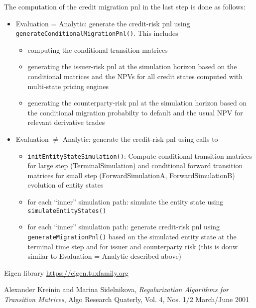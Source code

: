 \documentclass[12pt, a4paper]{article}
\begin{document}
The computation of the credit migration pnl in the last step is done as follows:

\begin{itemize}
\item Evaluation = Analytic: generate the credit-risk pnl using \verb+generateConditionalMigrationPnl()+. This includes
  \begin{itemize}
  \item computing the conditional transition matrices
  \item generating the issuer-risk pnl at the simulation horizon based on the conditional matrices and the NPVs for all
    credit states computed with multi-state pricing engines
  \item generating the counterparty-risk pnl at the simulation horizon based on the conditional migration probabilty to
    default and the usual NPV for relevant derivative trades
  \end{itemize}
\item Evaluation $\neq$ Analytic: generate the credit-risk pnl using calls to
  \begin{itemize}
  \item \verb+initEntityStateSimulation()+: Compute conditional transition matrices for large step (TerminalSimulation) and
    conditional forward transition matrices for small step (ForwardSimulationA, ForwardSimulationB) evolution of entity states
  \item for each ``inner'' simulation path: simulate the entity state using \verb+simulateEntityStates()+
  \item for each ``inner'' simulation path: generate credit-risk pnl using \verb+generateMigrationPnl()+ based on the
    simulated entity state at the terminal time step and for issuer and counterparty risk (this is donw similar to
    Evaluation = Analytic described above)
  \end{itemize}
\end{itemize}

\begin{thebibliography}{*}

 Eigen library \url{https://eigen.tuxfamily.org}
  
 Alexander Kreinin and Marina Sidelnikova, {\em Regularization Algorithms for Transition Matrices}, Algo Research Quaterly, Vol. 4, Nos. 1/2 March/June 2001

\end{thebibliography}
\end{document}
